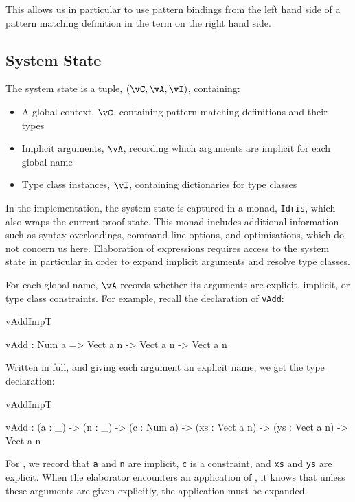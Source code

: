 This allows us in particular to use pattern bindings from the left hand side of a pattern
matching definition in the term on the right hand side.

\subsection{System State}

\label{sect:sysstate}

The system state is a tuple, $(\vC,\vA,\vI)$, containing:

\begin{itemize}
\item A global context, $\vC$, containing pattern matching definitions and their types
\item Implicit arguments, $\vA$, recording which arguments are implicit for each global name
\item Type class instances, $\vI$, containing dictionaries for type classes
\end{itemize}

In the implementation, the system state is captured in a monad, \texttt{Idris}, 
which also wraps the current proof state. This monad 
includes additional information such as syntax overloadings,
command line options, and optimisations, which do not concern us here. Elaboration
of expressions requires access to the system state in particular in order to expand
implicit arguments and resolve type classes. 

For each global name, $\vA$ records whether its arguments are explicit, implicit,
or type class constraints.  For example, recall the declaration
of \texttt{vAdd}:

\begin{SaveVerbatim}{vAddImpT}

vAdd : Num a => Vect a n -> Vect a n -> Vect a n

\end{SaveVerbatim}

\noindent
Written in full, and giving each argument an explicit name, we get the
type declaration:

\begin{SaveVerbatim}{vAddImpT}

vAdd : (a : _) -> (n : _) -> (c : Num a) -> 
       (xs : Vect a n) -> (ys : Vect a n) -> Vect a n

\end{SaveVerbatim}

\noindent
For , we record that \texttt{a} and \texttt{n} are implicit, 
\texttt{c} is a constraint, and \texttt{xs} and \texttt{ys} are explicit. When
the elaborator encounters an application of , it knows that unless these arguments
are given explicitly, the application must be expanded.

